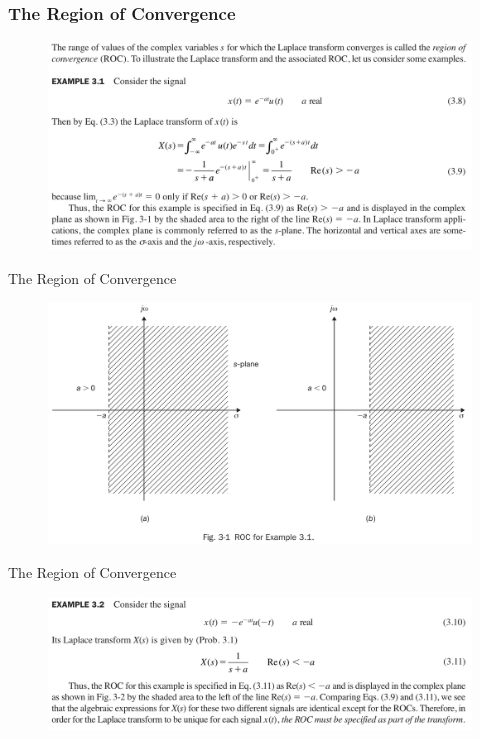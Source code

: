 \documentclass[pdflatex,compress,mathserif]{beamer}
\begin{document}
\begin{frame}
	\frametitle{The Region of Convergence}
	\begin{figure}
		\centering
		\includegraphics[width=\linewidth]{img/img05}
	\end{figure}
\end{frame}

\begin{frame}{The Region of Convergence}
	\begin{figure}
		\centering
		\includegraphics[width=\linewidth]{img/img06}
	\end{figure}
\end{frame}

\begin{frame}{The Region of Convergence}
	\begin{figure}
		\centering
		\includegraphics[width=\linewidth]{img/img07}
	\end{figure}
\end{frame}
\end{document}
